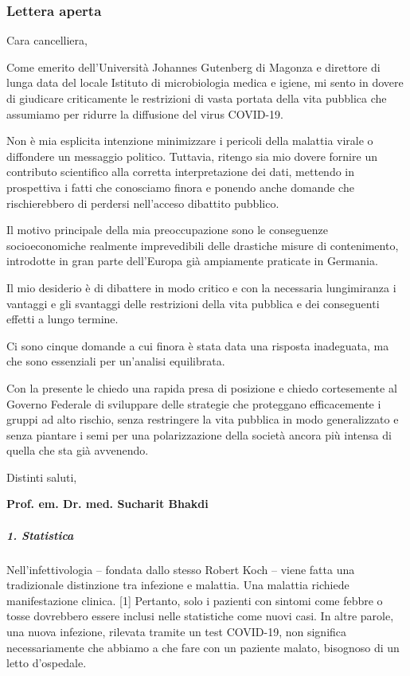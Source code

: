 \hypertarget{lettera-aperta}{%
\subsubsection{Lettera aperta}\label{lettera-aperta}}

Cara cancelliera,

Come emerito dell'Università Johannes Gutenberg di Magonza e direttore
di lunga data del locale Istituto di microbiologia medica e igiene, mi
sento in dovere di giudicare criticamente le restrizioni di vasta
portata della vita pubblica che assumiamo per ridurre la diffusione del
virus COVID-19.

Non è mia esplicita intenzione minimizzare i pericoli della malattia
virale o diffondere un messaggio politico. Tuttavia, ritengo sia mio
dovere fornire un contributo scientifico alla corretta interpretazione
dei dati, mettendo in prospettiva i fatti che conosciamo finora e
ponendo anche domande che rischierebbero di perdersi nell'acceso
dibattito pubblico.

Il motivo principale della mia preoccupazione sono le conseguenze
socioeconomiche realmente imprevedibili delle drastiche misure di
contenimento, introdotte in gran parte dell'Europa già ampiamente
praticate in Germania.

Il mio desiderio è di dibattere in modo critico e con la necessaria
lungimiranza i vantaggi e gli svantaggi delle restrizioni della vita
pubblica e dei conseguenti effetti a lungo termine.

Ci sono cinque domande a cui finora è stata data una risposta
inadeguata, ma che sono essenziali per un'analisi equilibrata.

Con la presente le chiedo una rapida presa di posizione e chiedo
cortesemente al Governo Federale di sviluppare delle strategie che
proteggano efficacemente i gruppi ad alto rischio, senza restringere la
vita pubblica in modo generalizzato e senza piantare i semi per una
polarizzazione della società ancora più intensa di quella che sta già
avvenendo.

Distinti saluti,

\textbf{Prof. em. Dr. med. Sucharit Bhakdi}

\hypertarget{1-statistica}{%
\subparagraph{\texorpdfstring{\textbf{1.
Statistica}}{1. Statistica}}\label{1-statistica}}

Nell'infettivologia -- fondata dallo stesso Robert Koch -- viene fatta
una tradizionale distinzione tra infezione e malattia. Una malattia
richiede manifestazione clinica. {[}1{]} Pertanto, solo i pazienti con
sintomi come febbre o tosse dovrebbero essere inclusi nelle statistiche
come nuovi casi. In altre parole, una nuova infezione, rilevata tramite
un test COVID-19, non significa necessariamente che abbiamo a che fare
con un paziente malato, bisognoso di un letto d'ospedale.

